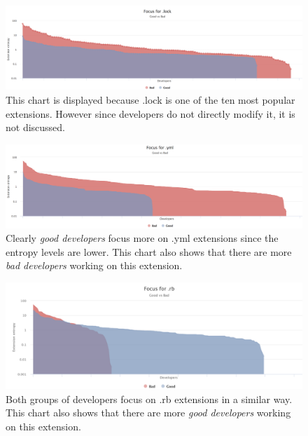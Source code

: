 \begin{figure}[htpb]
  \centering
  \includegraphics[width=1\textwidth]{figures/lock_log}
  \caption[Focus Chart for .lock]{This chart is displayed because .lock is one of the ten most popular extensions. However since developers do not directly modify it, it is not discussed.} \label{fig:lock_log_appendix}
\end{figure}

\begin{figure}[htpb]
  \centering
  \includegraphics[width=1\textwidth]{figures/yml_log}
  \caption[Focus Chart for .yml]{Clearly \textit{good developers} focus more on .yml extensions since the entropy levels are lower. This chart also shows that there are more \textit{bad developers} working on this extension.} \label{fig:yml_log_appendix}
\end{figure}

\begin{figure}[htpb]
  \centering
  \includegraphics[width=1\textwidth]{figures/rb_log}
  \caption[Focus Chart for .rb]{Both groups of developers focus on .rb extensions in a similar way. This chart also shows that there are more \textit{good developers} working on this extension.} \label{fig:rb_log_appendix}
\end{figure}



